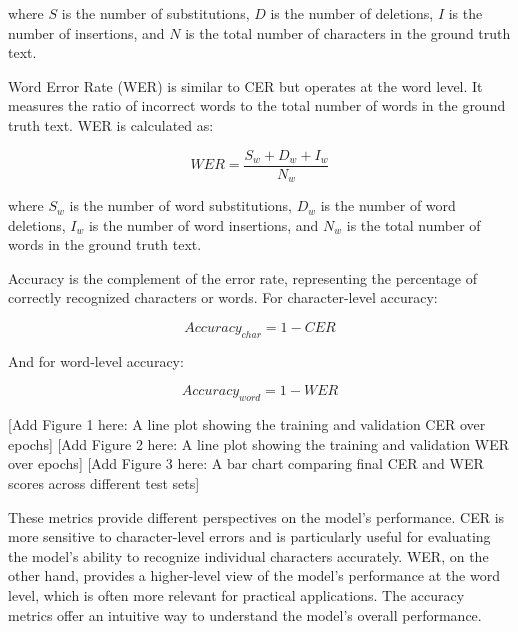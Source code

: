 where $S$ is the number of substitutions, $D$ is the number of deletions, $I$ is the number of insertions, and $N$ is the total number of characters in the ground truth text.

Word Error Rate (WER) is similar to CER but operates at the word level. It measures the ratio of incorrect words to the total number of words in the ground truth text. WER is calculated as:

\begin{equation}
    WER = \frac{S_w + D_w + I_w}{N_w}
\end{equation}

where $S_w$ is the number of word substitutions, $D_w$ is the number of word deletions, $I_w$ is the number of word insertions, and $N_w$ is the total number of words in the ground truth text.

Accuracy is the complement of the error rate, representing the percentage of correctly recognized characters or words. For character-level accuracy:

\begin{equation}
    Accuracy_{char} = 1 - CER
\end{equation}

And for word-level accuracy:

\begin{equation}
    Accuracy_{word} = 1 - WER
\end{equation}

[Add Figure 1 here: A line plot showing the training and validation CER over epochs]
[Add Figure 2 here: A line plot showing the training and validation WER over epochs]
[Add Figure 3 here: A bar chart comparing final CER and WER scores across different test sets]

These metrics provide different perspectives on the model's performance. CER is more sensitive to character-level errors and is particularly useful for evaluating the model's ability to recognize individual characters accurately. WER, on the other hand, provides a higher-level view of the model's performance at the word level, which is often more relevant for practical applications. The accuracy metrics offer an intuitive way to understand the model's overall performance.
